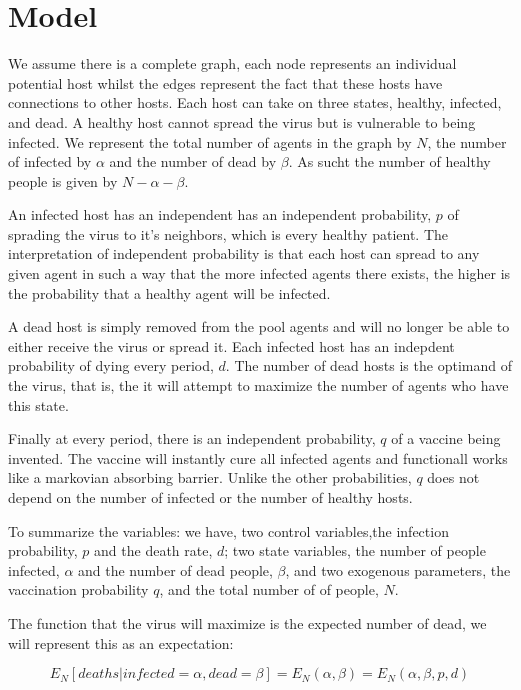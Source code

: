 \documentclass[12pt]{report}
\numberwithin{equation}{section}
\begin{document}
\section{Model}

We assume there is a complete graph, each node represents an individual potential host whilst the edges represent the fact that these hosts have connections to other hosts. Each host can take on three states, healthy, infected, and dead. A healthy host cannot spread the virus but is vulnerable to being infected. We represent the total number of agents in the graph by $N$, the number of infected by $\alpha$ and the number of dead by $\beta$. As sucht the number of healthy people is given by $N-\alpha-\beta$. 

An infected host has an independent has an independent probability, $p$ of sprading the virus to it's neighbors, which is every healthy patient. The interpretation of independent probability is that each host can spread to any given agent in such a way that the more infected agents there exists, the higher is the probability that a healthy agent will be infected. 

A dead host is simply removed from the pool agents and will no longer be able to either receive the virus or spread it. Each infected host has an indepdent probability of dying every period, $d$. The number of dead hosts is the optimand of the virus, that is, the it will attempt to maximize the number of agents who have this state. 

Finally at every period, there is an independent probability, $q$ of a vaccine being invented. The vaccine will instantly cure all infected agents and functionall works like a markovian absorbing barrier. Unlike the other probabilities, $q$ does not depend on the number of infected or the number of healthy hosts. 

To summarize the variables: we have, two control variables,the infection probability, $p$ and the death rate, $d$; two state variables, the number of people infected, $\alpha$ and the number of dead people, $\beta$, and two exogenous parameters, the vaccination probability $q$, and the total number of of people, $N$.  

The function that the virus will maximize is the expected number of dead, we will represent this as an expectation: 

\begin{equation*}
E_N[deaths | infected= \alpha, dead = \beta ] = E_N(\alpha ,\beta) = E_N(\alpha ,\beta, p, d) 
\end{equation*}
\end{document}
